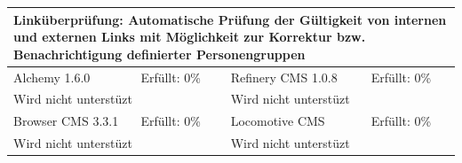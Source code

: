 \begin{tabular}[!ht]{|l|l|l|l|}
\hline
\multicolumn{4}{|p{15cm}|}{\textbf{Linküberprüfung: Automatische Prüfung der Gültigkeit von internen und externen Links mit Möglichkeit zur Korrektur bzw. Benachrichtigung definierter Personengruppen}} \\
\hline
  Alchemy 1.6.0 & \cellcolor{red}Erfüllt: 0\% & Refinery CMS 1.0.8 & \cellcolor{red}Erfüllt: 0\% \\
  \hline
  \multicolumn{2}{|p{7.5cm}|}{Wird nicht unterstüzt} & \multicolumn{2}{p{7.5cm}|}{Wird nicht unterstüzt} \\
  \hline
  Browser CMS 3.3.1 & \cellcolor{red}Erfüllt: 0\% & Locomotive CMS & \cellcolor{red}Erfüllt: 0\% \\
  \hline
  \multicolumn{2}{|p{7.5cm}|}{Wird nicht unterstüzt} & \multicolumn{2}{p{7.5cm}|}{Wird nicht unterstüzt} \\
\hline
\end{tabular}


